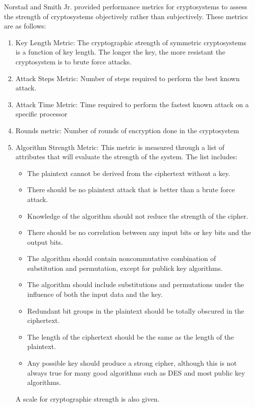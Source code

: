 Norstad and Smith Jr. \cite{metrics} provided performance metrics for cryptosystems to assess the strength of cryptosystems objectively rather than subjectively. These metrics are as follows:
\begin{enumerate}
    \item Key Length Metric: The cryptographic strength of symmetric cryptosystems is a function of key length. The longer the key, the more resistant the cryptosystem is to brute force attacks.
    \item Attack Steps Metric: Number of steps required to perform the best known attack.
    \item Attack Time Metric: Time required to perform the fastest known attack on a specific processor
    \item Rounds metric: Number of rounds of encryption done in the cryptosystem
    \item Algorithm Strength Metric: This metric is measured through a list of attributes that will evaluate the strength of the system. The list includes:
    \begin{itemize}
        \item The plaintext cannot be derived from the ciphertext without a key.
        \item There should be no plaintext attack that is better than a brute force attack.
        \item Knowledge of the algorithm should not reduce the strength of the cipher.
        \item There should be no correlation between any input bits or key bits and the output bits.
        \item The algorithm should contain noncommutative combination of substitution and permutation, except for publick key algorithms.
        \item The algorithm should include substitutions and permutations
        under the influence of both the input data and the key.
        \item Redundant bit groups in the plaintext should be totally obscured in the ciphertext.
        \item The length of the ciphertext should be the same as the length of the plaintext.
        \item Any possible key should produce a strong cipher, although this is not always true for many good algorithms such as DES and most public key algorithms.
    \end{itemize}
    A scale for cryptographic strength is also given.

\end{enumerate}
